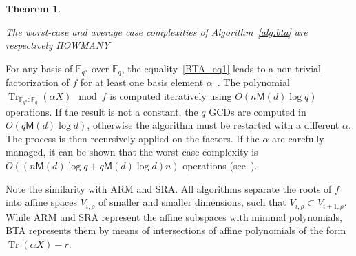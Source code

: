 \documentclass{article}
\newcommand{\ff}[1]{\mathbb{F}_{#1}}
\newcommand{\dd}{d}
\newcommand{\qq}{q}
\newcommand{\nn}{n}
\newcommand{\qn}{{\qq^\nn}}
\newcommand{\basef}{\ff{\qq}}
\newcommand{\extf}{\ff{\qn}}
\DeclareMathOperator{\Tr}{Tr}
\newcommand{\trabs}[2]{\Tr_{#1:#2}}
\newcommand{\trextbase}{\trabs{\extf}{\basef}}
\newcommand{\bigO}{O}
\newcommand{\Mul}{\mathsf{M}}
\newcounter{algo}
\newtheorem{Theo}{Theorem}
\newtheorem{Lem}{Lemma}
\begin{document}
\begin{Theo}~\cite{Menvanovans92}

The worst-case and average case complexities of Algorithm~\ref{alg:bta} are respectively  HOWMANY


\end{Theo}







%
For any basis of $\extf$ over $\basef$, the equality~\eqref{BTA_eq1} leads to a non-trivial factorization of $f$ for at least one basis element $\alpha$~\cite{berl70}.
The polynomial $\trextbase(\alpha X) \mod f$ is computed iteratively using
$O(\nn\Mul(d)\log\qq)$ operations. If the result is not a constant,
the $\qq$ GCDs are computed in $O(\qq\Mul(d)\log\dd)$, otherwise the
algorithm must be restarted with a different $\alpha$. 
The process is then recursively applied on the factors. 
 If the $\alpha$ are carefully managed, it can be shown that the worst case complexity is
$\bigO((\nn\Mul(d)\log\qq+\qq\Mul(d)\log\dd) \nn)$ 
operations (see~\cite{Menvanovans92}).








Note the similarity with ARM and SRA. All algorithms separate the roots of $f$ into affine spaces $V_{i,\rho}$ of smaller and smaller dimensions, such that $V_{i,\rho}\subset V_{i+1,\rho}$. While ARM and SRA represent the affine subspaces with minimal polynomials, BTA represents them by means of intersections of affine polynomials of the form $\Tr(\alpha X)-r$.
\end{document}
